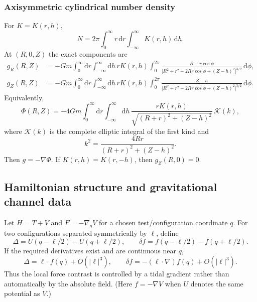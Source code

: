 \documentclass[11pt]{article}
\theoremstyle{definition}
\theoremstyle{remark}
\newcommand{\dd}{\mathrm{d}}
\begin{document}
\subsubsection{Axisymmetric cylindrical number density}
For $K=K(r,h)$,
\begin{equation}
  N=2\pi\int_0^\infty r\,\dd r\int_{-\infty}^\infty K(r,h)\,\dd h.
\end{equation}
At $(R,0,Z)$ the exact components are
\begin{align}
  g_R(R,Z)
  &=-Gm\int_0^\infty\mathrm{d}r\int_{-\infty}^\infty\mathrm{d}h\,
    r K(r,h)
    \int_0^{2\pi}\frac{R-r\cos\phi}{\bigl[R^2+r^2-2Rr\cos\phi+(Z-h)^2\bigr]^{3/2}}\,\mathrm{d}\phi,
  \\
  g_Z(R,Z)
  &=-Gm\int_0^\infty\mathrm{d}r\int_{-\infty}^\infty\mathrm{d}h\,
    r K(r,h)
    \int_0^{2\pi}\frac{Z-h}{\bigl[R^2+r^2-2Rr\cos\phi+(Z-h)^2\bigr]^{3/2}}\,\mathrm{d}\phi.
\end{align}
Equivalently,
\begin{equation}
  \Phi(R,Z)
  =-4Gm\int_0^\infty\mathrm{d}r\int_{-\infty}^\infty\mathrm{d}h\,
    \frac{r K(r,h)}{\sqrt{(R+r)^2+(Z-h)^2}}\,\mathcal{K}(k),
\end{equation}
where $\mathcal K(k)$ is the complete elliptic integral of the first kind and
\begin{equation}
  k^2=\frac{4Rr}{(R+r)^2+(Z-h)^2}.
\end{equation}
Then $g=-\nabla\Phi$. If $K(r,h)=K(r,-h)$, then $g_Z(R,0)=0$.

\subsection{Hamiltonian structure and gravitational channel data}
Let $H=T+V$ and $F=-\nabla_q V$ for a chosen test/configuration coordinate $q$.
For two configurations separated symmetrically by $\ell$, define
\begin{equation}
  \Delta=U(q-\ell/2)-U(q+\ell/2),\qquad
  \delta f=f(q-\ell/2)-f(q+\ell/2).
\end{equation}
If the required derivatives exist and are continuous near $q$,
\begin{equation}
  \Delta=\ell\cdot f(q)+O(\lvert\ell\rvert^3),\qquad
  \delta f=-(\ell\cdot\nabla)f(q)+O(\lvert\ell\rvert^3).
\end{equation}
Thus the local force contrast is controlled by a tidal gradient rather than automatically by the absolute field.
(Here $f=-\nabla V$ when $U$ denotes the same potential as $V$.)
\end{document}
